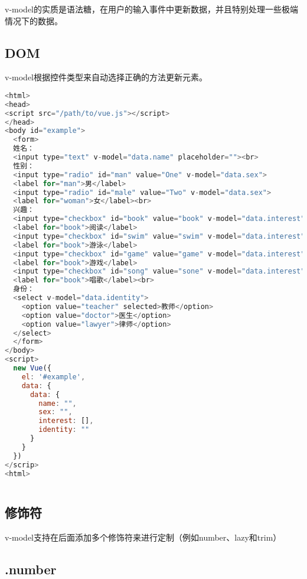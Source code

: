 v-model的实质是语法糖，在用户的输入事件中更新数据，并且特别处理一些极端情况下的数据。


\subsection{DOM}


v-model根据控件类型来自动选择正确的方法更新元素。


\begin{lstlisting}[language=JavaScript]
<html>
<head>
<script src="/path/to/vue.js"></script>
</head>
<body id="example">
  <form>
  姓名：
  <input type="text" v-model="data.name" placeholder=""><br>
  性别：
  <input type="radio" id="man" value="One" v-model="data.sex">
  <label for="man">男</label>
  <input type="radio" id="male" value="Two" v-model="data.sex">
  <label for="woman">女</label><br>
  兴趣：
  <input type="checkbox" id="book" value="book" v-model="data.interest">
  <label for="book">阅读</label>
  <input type="checkbox" id="swim" value="swim" v-model="data.interest">
  <label for="book">游泳</label>
  <input type="checkbox" id="game" value="game" v-model="data.interest">
  <label for="book">游戏</label>
  <input type="checkbox" id="song" value="sone" v-model="data.interest">
  <label for="book">唱歌</label><br>
  身份：
  <select v-model="data.identity">
    <option value="teacher" selected>教师</option>
    <option value="doctor">医生</option>
    <option value="lawyer">律师</option>
  </select>
  </form>
</body>
<script>
  new Vue({
    el: '#example',
    data: {
      data: {
        name: "",
        sex: "",
        interest: [],
        identity: ""
      }
    }
  })
</scrip>
<html>
\end{lstlisting}



\begin{lstlisting}[language=JavaScript]

\end{lstlisting}


\subsection{修饰符}

v-model支持在后面添加多个修饰符来进行定制（例如number、lazy和trim）


\subsection{.number}

